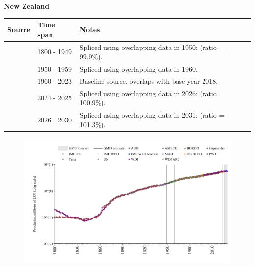 \documentclass[12pt,a4paper,landscape]{article}
\begin{document}
\begin{adjustbox}{max totalsize={\paperwidth}{\paperheight},center}
\begin{minipage}[t][\textheight][t]{\textwidth}
\vspace*{0.5cm}
{}
\begin{center}
{\Large\bfseries New Zealand}
\end{center}
\vspace{0.5cm}
\begin{table}[H]
\centering
\small
\begin{tabular}{|l|l|l|}
\hline
\textbf{Source} & \textbf{Time span} & \textbf{Notes} \\
\hline
\rowcolor{white}\cite{Gapminder}& 1800 - 1949 &Spliced using overlapping data in 1950: (ratio = 99.9\%).\\
\rowcolor{lightgray}\cite{IMF_IFS}& 1950 - 1959 &Spliced using overlapping data in 1960.\\
\rowcolor{white}\cite{WDI}& 1960 - 2023 &Baseline source, overlaps with base year 2018.\\
\rowcolor{lightgray}\cite{OECD_EO}& 2024 - 2025 &Spliced using overlapping data in 2026: (ratio = 100.9\%).\\
\rowcolor{white}\cite{Gapminder}& 2026 - 2030 &Spliced using overlapping data in 2031: (ratio = 101.3\%).\\
\hline
\end{tabular}
\end{table}
\begin{figure}[H]
\centering
\includegraphics[width=\textwidth,height=0.6\textheight,keepaspectratio]{graphs/NZL_pop.pdf}
\end{figure}
\end{minipage}
\end{adjustbox}
\end{document}
